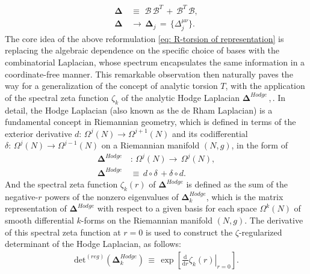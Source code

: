 \begin{equation}
    \begin{split}
        \mathbf{\Delta}\,&\equiv\,\,\mathcal{B}\,\mathcal{B}^T\,+\,\mathcal{B}^T\,\mathcal{B}, \\
        \mathbf{\Delta}\,&\rightarrow\,\mathbf{\Delta}_j\,=\,\{\Delta_j^{\mu\nu}\}.
    \end{split}
\end{equation}
The core idea of the above reformulation \eqref{eq: R-torsion of representation} is replacing the algebraic dependence on the specific choice of bases with the combinatorial Laplacian, whose spectrum encapsulates the same information in a coordinate-free manner. This remarkable observation then naturally paves the way for a generalization of the concept of analytic torsion $T$, with the application of the spectral zeta function $\zeta_k$ of the analytic Hodge Laplacian $\mathbf{\Delta}^{Hodge}$\,\cite{raySinger71rtorsion},\,\cite{raySinger1973Analytic}. In detail, the Hodge Laplacian (also known as the de Rham Laplacian) is a fundamental concept in Riemannian geometry, which is defined in terms of the exterior derivative $d:\,\Omega^j\left(N\right)\rightarrow\Omega^{j+1}\left(N\right)$ and its codifferential $\delta:\,\Omega^j\left(N\right)\rightarrow\Omega^{j-1}\left(N\right)$ on a Riemannian manifold $\left(N,g\right)$, in the form of 
\begin{equation}
    \begin{split}
        \mathbf{\Delta}^{Hodge}&:\,\Omega^j\left(N\right)\rightarrow\,\Omega^j\left(N\right),\\
        \mathbf{\Delta}^{Hodge}\,&\equiv\,d\circ\delta\,+\delta\circ d.
    \end{split}
\end{equation}
And the spectral zeta function $\zeta_k\left(r\right)$ of $\mathbf{\Delta}^{Hodge}$ is defined as the sum of the negative-$r$ powers of the nonzero eigenvalues of $\mathbf{\Delta}_k^{Hodge}$, which is the matrix representation of $\mathbf{\Delta}^{Hodge}$ with respect to a given basis for each space $\Omega^k\left(N\right)$ of smooth differential $k$-forms on the Riemannian manifold $\left(N,g\right)$. The derivative of this spectral zeta function at $r=0$ is used to construct the $\zeta$-regularized determinant of the Hodge Laplacian, as follows:
\begin{equation}\label{eq: regularized determinant of the Hodge Laplacian}
    \begin{split}
        \mathrm{det}^{(reg)}\left(\mathbf{\Delta}_k^{Hodge}\right)\,\equiv\,\exp\left[\left.\frac{\mathrm{d}}{\mathrm{d}r}\zeta_k\left(r\right)\right|_{r=0}\right].
    \end{split}
\end{equation}
